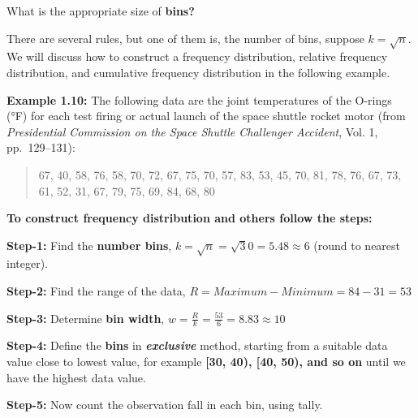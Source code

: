 \documentclass[
  11pt,
  letterpaper,
  DIV=11,
  numbers=noendperiod]{scrreprt}
\begin{document}
What is the appropriate size of \textbf{bins?}

There are several rules, but one of them is, the number of bins, suppose
\(k=\sqrt n\). We will discuss how to construct a frequency
distribution, relative frequency distribution, and cumulative frequency
distribution in the following example.

\textbf{Example 1.10:} The following data are the joint temperatures of
the O-rings (°F) for each test firing or actual launch of the space
shuttle rocket motor (from \emph{Presidential Commission on the Space
Shuttle Challenger Accident}, Vol. 1, pp.~129--131):

\begin{quote}
67, 40, 58, 76, 58, 70, 72, 67, 75, 70, 57, 83, 53, 45, 70, 81, 78, 76,
67, 73, 61, 52, 31, 67, 79, 75, 69, 84, 68, 80
\end{quote}

\textbf{To construct frequency distribution and others follow the
steps:}

\textbf{Step-1:} Find the \textbf{number bins},
\(k=\sqrt n=\sqrt 30=5.48\approx 6\) (round to nearest integer).

\textbf{Step-2:} Find the range of the data,
\(R=Maximum-Minimum=84-31=53\)

\textbf{Step-3:} Determine \textbf{bin width},
\(w=\frac{R}{k}=\frac{53}{6}=8.83 \approx 10\)

\textbf{Step-4:} Define the \textbf{bins} in \textbf{\emph{exclusive}}
method, starting from a suitable data value close to lowest value, for
example \textbf{{[}30, 40), {[}40, 50), and so on} until we have the
highest data value.

\textbf{Step-5:} Now count the observation fall in each bin, using
tally.
\end{document}
